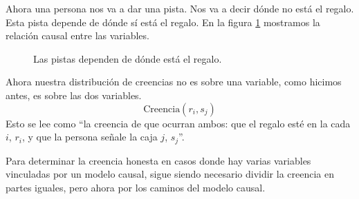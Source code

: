 \documentclass[a4paper,10pt]{book}
\begin{document}
Ahora una persona nos va a dar una pista.
Nos va a decir dónde no está el regalo.
Esta pista depende de dónde sí está el regalo.
En la figura \ref{fig:modelo_causal_base} mostramos la relación causal entre las variables.
\begin{figure}[H]     
 \centering
  \caption{Las pistas dependen de dónde está el regalo.}
  \label{fig:modelo_causal_base}
\end{figure}

Ahora nuestra distribución de creencias no es sobre una variable, como hicimos antes, es sobre las dos variables.
\begin{equation}
 \text{Creencia}(r_i, s_j)
\end{equation}
Esto se lee como ``la creencia de que ocurran ambos: que el regalo esté en la cada $i$, $r_i$, y que la persona señale la caja $j$, $s_j$''.

\vspace{0.3cm}

Para determinar la creencia honesta en casos donde hay varias variables vinculadas por un modelo causal, sigue siendo necesario dividir la creencia en partes iguales, pero ahora por los caminos del modelo causal.
\end{document}
